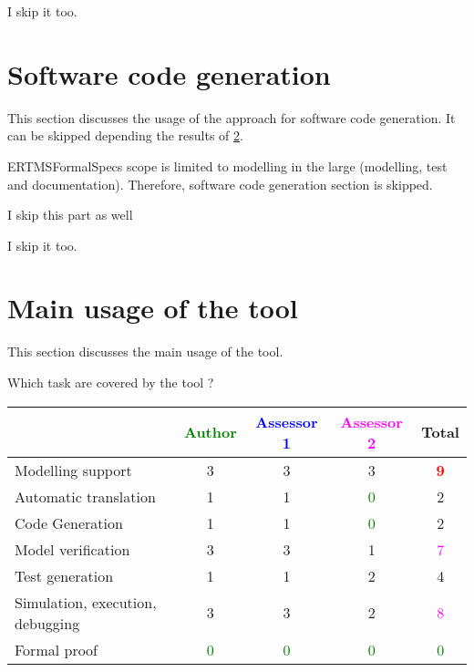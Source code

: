 \begin{assessor2}
I skip it too.
\end{assessor2}


\section{Software code generation}
This section discusses the usage of the approach for software code generation.
It can be skipped depending the results of \ref{main_usage}.

\begin{author_comment}
ERTMSFormalSpecs scope is limited to modelling in the large (modelling, test and documentation). Therefore, software code generation section is skipped.  
\end{author_comment}

\begin{assessor1}
I skip this part as well
\end{assessor1}


\begin{assessor2}
I skip it too.
\end{assessor2}


\section{Main usage of the tool}
\label{main_usage}

This section discusses the main usage of the tool.

Which task are covered by the tool ?

\begin{tabular}{|l | c | c | c | c|}
\hline
& \textcolor{green}{Author} & \textcolor{blue}{Assessor 1} & \textcolor{magenta}{Assessor 2} & Total \\
\hline 
Modelling support & 3     & 3     & 3     & \textcolor{red}{\textbf{9}} \\
\hline
Automatic translation  & 1     & 1     & \textcolor{green}{0} & 2     \\
\hline
Code Generation  & 1     & 1     & \textcolor{green}{0} & 2     \\
\hline
Model verification & 3     & 3     & 1     & \textcolor{magenta}{7} \\
\hline
Test generation & 1     & 1     & 2     & 4     \\
\hline
Simulation, execution, debugging & 3     & 3     & 2     & \textcolor{magenta}{8} \\
\hline
Formal proof & \textcolor{green}{0} & \textcolor{green}{0} & \textcolor{green}{0} & \textcolor{green}{0} \\
\hline
\end{tabular}



